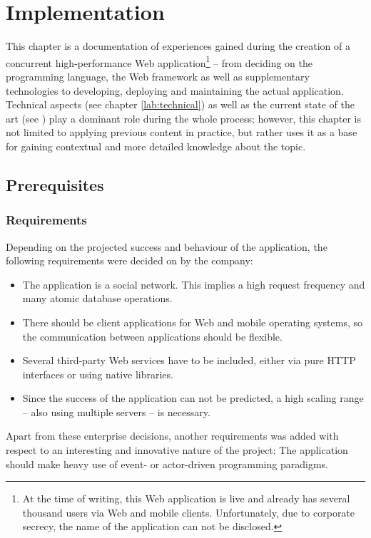 \chapter{Implementation}
\label{sec:impl}
This chapter is a documentation of experiences gained during the creation of a concurrent high-performance Web application\footnote{At the time of writing, this Web application is live and already has several thousand users via Web and mobile clients. Unfortunately, due to corporate secrecy, the name of the application can not be disclosed.} -- from deciding on the programming language, the Web framework as well as supplementary technologies to developing, deploying and maintaining the actual application. Technical aspects (see chapter \ref{lab:technical}) as well as the current state of the art (see ) play a dominant role during the whole process; however, this chapter is not limited to applying previous content in practice, but rather uses it as a base for gaining contextual and more detailed knowledge about the topic.

\section{Prerequisites}
\label{sec:prerequitites}
\subsection{Requirements}
Depending on the projected success and behaviour of the application, the following requirements were decided on by the company:

\begin{itemize}
  \item{The application is a social network. This implies a high request frequency and many atomic database operations.}
  \item{There should be client applications for Web and mobile operating systems, so the communication between applications should be flexible.}
  \item{Several third-party Web services have to be included, either via pure HTTP interfaces or using native libraries.}
  \item{Since the success of the application can not be predicted, a high scaling range -- also using multiple servers -- is necessary.}
\end{itemize}

Apart from these enterprise decisions, another requirements was added with respect to an interesting and innovative nature of the project: The application should make heavy use of event- or actor-driven programming paradigms.

